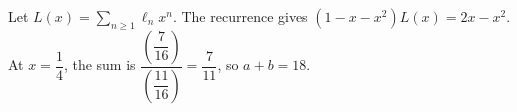 Let $L(x)=\sum_{n\ge1}\ell_nx^n$. The recurrence gives $(1-x-x^2)L(x)=2x-x^2$. At $x=\dfrac{1}{4}$, the sum is $\dfrac{(\dfrac{7}{16})}{(\dfrac{11}{16})}=\dfrac{7}{11}$, so $a+b=\boxed{18}$.
